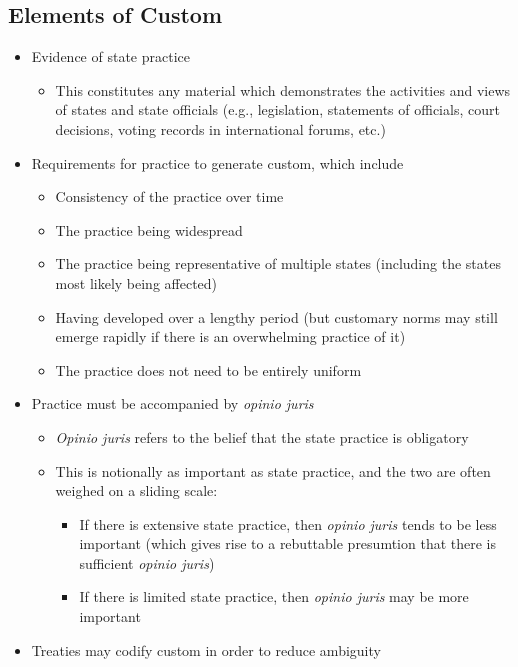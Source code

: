 \subsection{Elements of Custom}
\begin{itemize}
    \item Evidence of state practice
    \begin{itemize}
        \item This constitutes any material which demonstrates the activities and views of states and state officials (e.g., legislation, statements of officials, court decisions, voting records in international forums, etc.)
    \end{itemize}
    \item Requirements for practice to generate custom, which include
    \begin{itemize}
        \item Consistency of the practice over time
        \item The practice being widespread
        \item The practice being representative of multiple states (including the states most likely being affected)
        \item Having developed over a lengthy period (but customary norms may still emerge rapidly if there is an overwhelming practice of it)
        \item The practice does not need to be entirely uniform
    \end{itemize}
    \item Practice must be accompanied by \textit{opinio juris}
    \begin{itemize}
        \item \textit{Opinio juris} refers to the belief that the state practice is obligatory
        \item This is notionally as important as state practice, and the two are often weighed on a sliding scale:
        \begin{itemize}
            \item If there is extensive state practice, then \textit{opinio juris} tends to be less important (which gives rise to a rebuttable presumtion that there is sufficient \textit{opinio juris})
            \item If there is limited state practice, then \textit{opinio juris} may be more important
        \end{itemize}
    \end{itemize}
    \item Treaties may codify custom in order to reduce ambiguity
\end{itemize}


